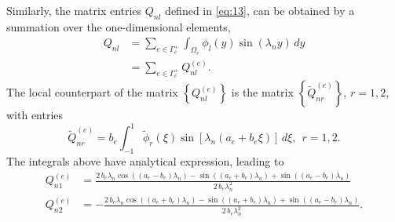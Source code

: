 \documentclass[11pt]{article}
\newcommand{\wt}[1]{\widetilde{#1}}
\begin{document}
Similarly, the matrix entries $Q_{nl}$ defined in \eqref{eq:13}, can be obtained by a summation over the one-dimensional elements,
\begin{align}
  \label{eq:22}
  Q_{nl} &= \sum_{e \in \Gamma_e^+} \int_{\Omega_e} \phi_l(y) \sin(\lambda_n y)\, dy \\
         &= \sum_{e \in \Gamma_e^+} Q_{nl}^{(e)}.
\end{align}
The local counterpart of the matrix $\left\{Q_{nl}^{(e)}\right\}$ is the matrix $\left\{\wt{Q}_{nr}^{(e)}\right\}$, $r=1,2$, with entries
\begin{equation}
  \label{eq:23}
  \wt{Q}_{nr}^{(e)} = b_e \int_{-1}^1 \wt{\phi}_r(\xi)\sin[\lambda_n(a_e + b_e\xi)]\,d\xi,~~r = 1,2.
\end{equation}
The integrals above have analytical expression, leading to
\begin{align}
  Q_{n1}^{(e)} &= \frac{2 \, b_{e} \lambda_{n} \cos\left({\left(a_{e} - b_{e}\right)} \lambda_{n}\right) - \sin\left({\left(a_{e} + b_{e}\right)} \lambda_{n}\right) + \sin\left({\left(a_{e} - b_{e}\right)} \lambda_{n}\right)}{2 \, b_{e} \lambda_{n}^{2}} \\
  Q_{n2}^{(e)} &= -\frac{2 \, b_{e} \lambda_{n} \cos\left({\left(a_{e} + b_{e}\right)} \lambda_{n}\right) - \sin\left({\left(a_{e} + b_{e}\right)} \lambda_{n}\right) + \sin\left({\left(a_{e} - b_{e}\right)} \lambda_{n}\right)}{2 \, b_{e} \lambda_{n}^{2}}.
\end{align}




\clearpage



 
\end{document}
